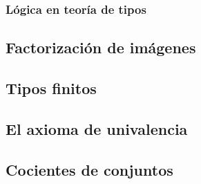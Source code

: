 \documentclass{article}
\begin{document}
\subsubsection{Lógica en teoría de tipos}
\subsection{Factorización de imágenes}
\subsection{Tipos finitos}
\subsection{El axioma de univalencia}
\subsection{Cocientes de conjuntos}
\end{document}
